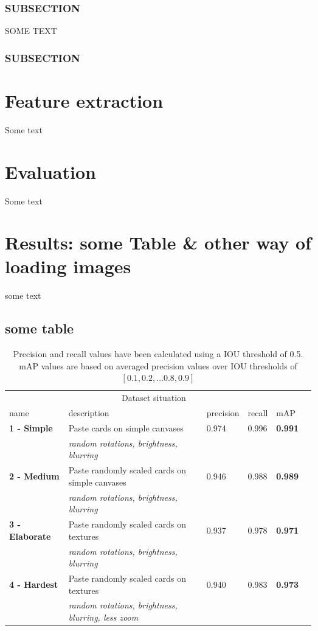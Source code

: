 \documentclass[a4paper]{article}
\begin{document}
\subsubsection*{SUBSECTION}
SOME TEXT 

\subsubsection*{SUBSECTION}


\section{Feature extraction}
Some text

\section{Evaluation}
Some text

\section{Results:  some Table \& other way of loading images}
some text

\subsection*{some table }
\begin{table}[h]


\begin{tabular}{lllllr}
\hline
\multicolumn{5}{c}{Dataset situation} \\
\cline{1-2}
name    & description  & precision & recall & mAP \\
\hline
\textbf{1 - Simple}      & Paste cards on simple canvases    &  0.974  & 0.996 & \textbf{0.991} \\
          & \textit{random rotations, brightness, blurring}     & & & \\
\textbf{2 - Medium}      & Paste randomly scaled cards on simple canvases & 0.946 & 0.988 & \textbf{0.989} \\
          & \textit{random rotations, brightness, blurring}     & & & \\
\textbf{3 - Elaborate}       & Paste randomly scaled cards on textures & 0.937 & 0.978 & \textbf{0.971} \\
          & \textit{random rotations, brightness, blurring}     & & & \\
\textbf{4 - Hardest} & Paste randomly scaled cards on textures & 0.940 & 0.983 & \textbf{0.973} \\
          & \textit{random rotations, brightness, blurring, less zoom}     & & & \\
\hline


\end{tabular}
\caption{Precision and recall values have been calculated using a IOU threshold of 0.5. mAP values are based on averaged precision values over IOU thresholds of $[0.1, 0.2, \dots 0.8, 0.9] $  }
\label{tab:res}
\end{table}
\end{document}
